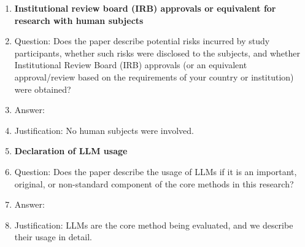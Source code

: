 \documentclass{article}
\begin{document}
\begin{enumerate}
\item {\bf Institutional review board (IRB) approvals or equivalent for research with human subjects}
    \item[] Question: Does the paper describe potential risks incurred by study participants, whether such risks were disclosed to the subjects, and whether Institutional Review Board (IRB) approvals (or an equivalent approval/review based on the requirements of your country or institution) were obtained?
    \item[] Answer: \answerNA{}
    \item[] Justification: No human subjects were involved.

\item {\bf Declaration of LLM usage}
    \item[] Question: Does the paper describe the usage of LLMs if it is an important, original, or non-standard component of the core methods in this research?
    \item[] Answer: \answerYes{}
    \item[] Justification: LLMs are the core method being evaluated, and we describe their usage in detail.

\end{enumerate}
\end{document}
